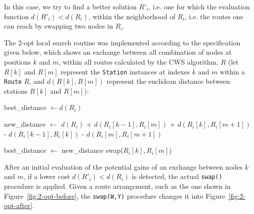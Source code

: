 In this case, we try to find a better solution $R'_i$, i.e. one for which the 
evaluation function $d(R'_i) < d(R_i)$, within the neighborhood of $R_i$, i.e. 
the routes one can reach by swapping two nodes in $R_i$.\vertbreak

The 2-opt local search routine was implemented according to the specification 
given below, which shows an exchange between all combination of nodes at 
positions $k$ and $m$, within all routes calculated by the CWS algorithm, 
$R$ (let $R[k]$ and $R[m]$ represent the \verb+Station+ instances at indexes 
$k$ and $m$ within a \verb+Route+ $R$, and $d(R[k], R[m])$ represent the 
euclidean distance between stations $R[k]$ and $R[m]$):\vertbreak

\begin{algorithmic}[1]

    \State best\_distance $ \leftarrow d(R_i)$ 



            \State new\_distance $ \leftarrow $
            \Statex[4] $d(R_i)$ 
            \Statex[4] + $d(R_i[k - 1], R_i[m])$ 
            \Statex[4] + $d(R_i[k], R_i[m + 1])$ 
            \Statex[4] - $d(R_i[k - 1], R_i[k])$ 
            \Statex[4] - $d(R_i[m], R_i[m + 1])$


                \State best\_distance $ \leftarrow $ new\_distance
                \State swap($R_i[k],R_i[m]$)
            \EndIf

        \EndFor

    \EndFor

\EndFor
\end{algorithmic}\vertbreak

After an initial evaluation of the potential gains of an exchange between 
nodes $k$ and $m$, if a lower cost $d(R'_i) < d(R_i)$ is detected, the 
actual \verb?swap()? procedure is applied. Given a route arrangement, such as 
the one shown in Figure~\ref{fig:2-opt-before}, the \verb?swap(W,Y)? procedure 
changes it into Figure~\ref{fig:2-opt-after}.


